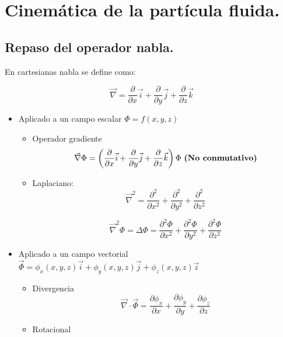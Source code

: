 \chapter{Cinemática de la partícula fluida.}

\section{Repaso del operador nabla.}
En cartesianas nabla se define como:

\[\vec\nabla=\dfrac{\partial}{\partial x}\vec i + \dfrac{\partial}{\partial y}\vec j +\dfrac{\partial}{\partial z}\vec k\]

\begin{itemize}
	\item Aplicado a un campo escalar $\Phi = f(x,y,z)$
	
	\begin{itemize}
		\item Operador gradiente
		\[\vec\nabla \Phi = \left(\dfrac{\partial}{\partial x}\vec i + \dfrac{\partial}{\partial y}\vec j +\dfrac{\partial}{\partial z}\vec k\right) \Phi \text{ \textbf{(No conmutativo)}}\]

\item Laplaciano: 
\[\vec\nabla^2=\dfrac{\partial^2}{\partial x^2}+\dfrac{\partial^2}{\partial y^2}+\dfrac{\partial^2}{\partial z^2}\]

\[\vec\nabla^2\Phi=\Delta\Phi=\dfrac{\partial^2\Phi}{\partial x^2}+\dfrac{\partial^2\Phi}{\partial y^2}+\dfrac{\partial^2\Phi}{\partial z^2}\]
	\end{itemize}
	
	\item Aplicado a un campo vectorial $\vec\Phi = \phi_x(x,y,z)\vec i+\phi_y(x,y,z)\vec j+\phi_z(x,y,z)\vec z$
	\begin{itemize}
		\item Divergencia
		\[\vec\nabla \cdot \vec\Phi = \dfrac{\partial \phi_x}{\partial x} + \dfrac{\partial \phi_y}{\partial y} + \dfrac{\partial \phi_z}{\partial z}\]
		
		\item Rotacional
		

\end{itemize}
\end{itemize}
